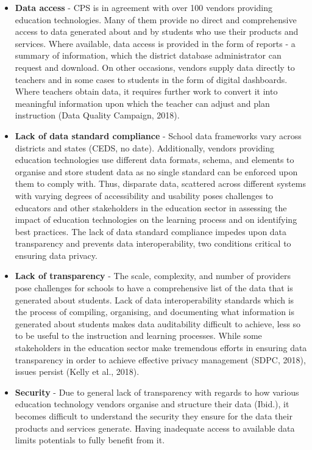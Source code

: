 \documentclass{article}
\begin{document}
\begin{itemize}
  \item \textbf{Data access} - CPS is in agreement with over 100 vendors providing education technologies. Many of them provide no direct and comprehensive access to data generated about and by students who use their products and services. Where available, data access is  provided in the form of reports - a summary of information, which the district database administrator can request and download. On other occasions, vendors supply data directly to teachers and in some cases to students in the form of digital dashboards. Where teachers obtain data, it requires further work to convert it into meaningful information upon which the teacher can adjust and plan instruction (Data Quality Campaign, 2018). 
  
  \item \textbf{Lack of data standard compliance} - School data frameworks vary across districts and states (CEDS, no date). Additionally, vendors providing education technologies use different data formats, schema, and elements to organise and store student data as no single standard can be enforced upon them to comply with. Thus, disparate data, scattered across different systems with varying degrees of accessibility and usability poses challenges to educators and other stakeholders in the education sector in assessing the impact of education technologies on the learning process and on identifying best practices. The lack of data standard compliance impedes upon data transparency and prevents data interoperability, two conditions critical to ensuring data privacy. 
  
  \item \textbf{Lack of transparency} - The scale, complexity, and number of providers pose challenges for schools to have a comprehensive list of the data that is generated about students. Lack of data interoperability standards which is the process of compiling, organising, and documenting what information is generated about students makes data auditability difficult to achieve, less so to be useful to the instruction and learning processes. While some stakeholders in the education sector make tremendous efforts in ensuring data transparency in order to achieve effective privacy management (SDPC, 2018), issues persist (Kelly et al., 2018).
  
  \item \textbf{Security} - Due to general lack of transparency with regards to how various education technology vendors organise and structure their data (Ibid.), it becomes difficult to understand the security they ensure for the data their products and services generate. Having inadequate access to available data limits potentials to fully benefit from it.
  
\end{itemize}
\end{document}
